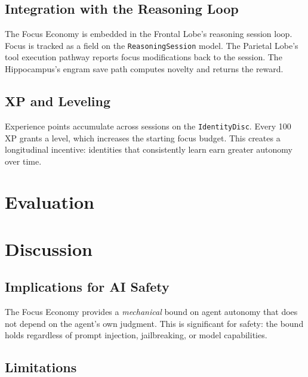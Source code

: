 \documentclass[man,12pt,floatsintext]{apa7}
\begin{document}
\subsection{Integration with the Reasoning Loop}

The Focus Economy is embedded in the Frontal Lobe's reasoning session loop. Focus is
tracked as a field on the \texttt{ReasoningSession} model. The Parietal Lobe's tool
execution pathway reports focus modifications back to the session. The Hippocampus's
engram save path computes novelty and returns the reward.

\subsection{XP and Leveling}

Experience points accumulate across sessions on the \texttt{IdentityDisc}. Every 100 XP
grants a level, which increases the starting focus budget. This creates a longitudinal
incentive: identities that consistently learn earn greater autonomy over time.

\section{Evaluation}


\section{Discussion}

\subsection{Implications for AI Safety}

The Focus Economy provides a \emph{mechanical} bound on agent autonomy that does not
depend on the agent's own judgment. This is significant for safety: the bound holds
regardless of prompt injection, jailbreaking, or model capabilities.

\subsection{Limitations}
\end{document}
